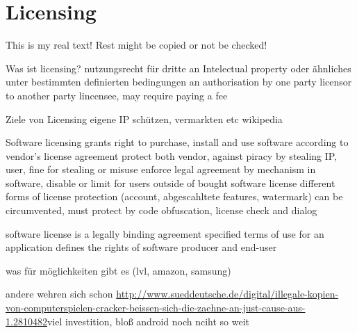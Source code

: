 \section{Licensing} \label{section:introduction-licensing}
This is my real text! Rest might be copied or not be checked!


%
Was ist licensing?
nutzungsrecht für dritte an Intelectual property oder ähnliches unter bestimmten definierten bedingungen
an authorisation by one party licensor to another party lincensee, may require paying a fee
\newline

Ziele von Licensing
eigene IP schützen, vermarkten etc
\newline
wikipedia
%

%
Software licensing grants right to purchase, install and use software according to vendor's license agreement
protect both vendor, against piracy by stealing IP, user, fine for stealing or misuse
enforce legal agreement by mechanism in software, disable or limit for users outside of bought software license
different forms of license protection (account, abgescahltete features, watermark)
can be circumvented, must protect by code obfuscation, license check and dialog
\cite{munteanLicense}
%

%
software license is a legally binding agreement
specified terms of use for an application
defines the rights of software producer and end-user
\cite{uncgLicensing}
%




was für möglichkeiten gibt es (lvl, amazon, samsung)\newline

andere wehren sich schon \url{http://www.sueddeutsche.de/digital/illegale-kopien-von-computerspielen-cracker-beissen-sich-die-zaehne-an-just-cause-aus-1.2810482}viel investition, bloß android noch nciht so weit
